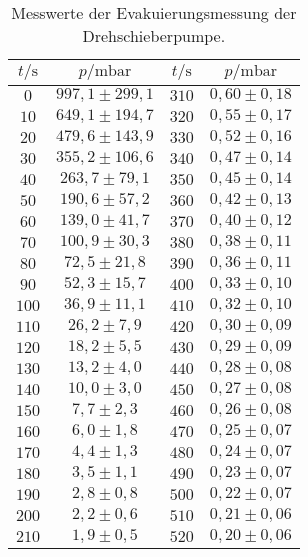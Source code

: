 \begin{table}[H]
  \centering
  \caption{Messwerte der Evakuierungsmessung der Drehschieberpumpe.}
  \label{tab:drehevak}
  \begin{tabular}{c c | c c}
    \toprule
    $t/\si{\second}$ & $p/\si{\milli\bar}$ & $t/\si{\second}$ & $p/\si{\milli\bar}$ \\ 
    \midrule
    $  0$ & $997,1 \pm 299,1$  & $310$ & $ 0,60 \pm 0,18 $ \\ 
    $ 10$ & $649,1 \pm 194,7$  & $320$ & $ 0,55 \pm 0,17 $ \\
    $ 20$ & $479,6 \pm 143,9$  & $330$ & $ 0,52 \pm 0,16 $ \\
    $ 30$ & $355,2 \pm 106,6$  & $340$ & $ 0,47 \pm 0,14 $ \\
    $ 40$ & $263,7 \pm  79,1$  & $350$ & $ 0,45 \pm 0,14 $ \\
    $ 50$ & $190,6 \pm  57,2$  & $360$ & $ 0,42 \pm 0,13 $ \\
    $ 60$ & $139,0 \pm  41,7$  & $370$ & $ 0,40 \pm 0,12 $ \\
    $ 70$ & $100,9 \pm  30,3$  & $380$ & $ 0,38 \pm 0,11 $ \\
    $ 80$ & $ 72,5 \pm  21,8$  & $390$ & $ 0,36 \pm 0,11 $ \\
    $ 90$ & $ 52,3 \pm  15,7$  & $400$ & $ 0,33 \pm 0,10 $ \\
    $100$ & $ 36,9 \pm  11,1$  & $410$ & $ 0,32 \pm 0,10 $ \\
    $110$ & $ 26,2 \pm   7,9$  & $420$ & $ 0,30 \pm 0,09 $ \\
    $120$ & $ 18,2 \pm   5,5$  & $430$ & $ 0,29 \pm 0,09 $ \\
    $130$ & $ 13,2 \pm   4,0$  & $440$ & $ 0,28 \pm 0,08 $ \\
    $140$ & $ 10,0 \pm   3,0$  & $450$ & $ 0,27 \pm 0,08 $ \\
    $150$ & $  7,7 \pm   2,3$  & $460$ & $ 0,26 \pm 0,08 $ \\
    $160$ & $  6,0 \pm   1,8$  & $470$ & $ 0,25 \pm 0,07 $ \\
    $170$ & $  4,4 \pm   1,3$  & $480$ & $ 0,24 \pm 0,07 $ \\
    $180$ & $  3,5 \pm   1,1$  & $490$ & $ 0,23 \pm 0,07 $ \\
    $190$ & $  2,8 \pm   0,8$  & $500$ & $ 0,22 \pm 0,07 $ \\
    $200$ & $  2,2 \pm   0,6$  & $510$ & $ 0,21 \pm 0,06 $ \\
    $210$ & $  1,9 \pm   0,5$  & $520$ & $ 0,20 \pm 0,06 $ \\

\end{tabular}
\end{table}
